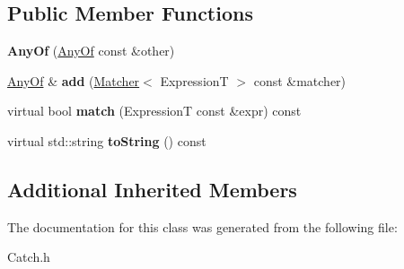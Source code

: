 \subsection*{Public Member Functions}
\begin{DoxyCompactItemize}
\item 
\hypertarget{class_catch_1_1_matchers_1_1_impl_1_1_generic_1_1_any_of_a74fbc05b32d334fcbfd0fae0163a404e}{{\bfseries Any\-Of} (\hyperlink{class_catch_1_1_matchers_1_1_impl_1_1_generic_1_1_any_of}{Any\-Of} const \&other)}\label{class_catch_1_1_matchers_1_1_impl_1_1_generic_1_1_any_of_a74fbc05b32d334fcbfd0fae0163a404e}

\item 
\hypertarget{class_catch_1_1_matchers_1_1_impl_1_1_generic_1_1_any_of_a3bce94b627551e5f96c5f9c6060413f0}{\hyperlink{class_catch_1_1_matchers_1_1_impl_1_1_generic_1_1_any_of}{Any\-Of} \& {\bfseries add} (\hyperlink{struct_catch_1_1_matchers_1_1_impl_1_1_matcher}{Matcher}$<$ Expression\-T $>$ const \&matcher)}\label{class_catch_1_1_matchers_1_1_impl_1_1_generic_1_1_any_of_a3bce94b627551e5f96c5f9c6060413f0}

\item 
\hypertarget{class_catch_1_1_matchers_1_1_impl_1_1_generic_1_1_any_of_a2f97a08338e12deba541043a57d73db9}{virtual bool {\bfseries match} (Expression\-T const \&expr) const }\label{class_catch_1_1_matchers_1_1_impl_1_1_generic_1_1_any_of_a2f97a08338e12deba541043a57d73db9}

\item 
\hypertarget{class_catch_1_1_matchers_1_1_impl_1_1_generic_1_1_any_of_a7ecc6ec08b2018a643923a9d450aa328}{virtual std\-::string {\bfseries to\-String} () const }\label{class_catch_1_1_matchers_1_1_impl_1_1_generic_1_1_any_of_a7ecc6ec08b2018a643923a9d450aa328}

\end{DoxyCompactItemize}
\subsection*{Additional Inherited Members}


The documentation for this class was generated from the following file\-:\begin{DoxyCompactItemize}
\item 
Catch.\-h\end{DoxyCompactItemize}
